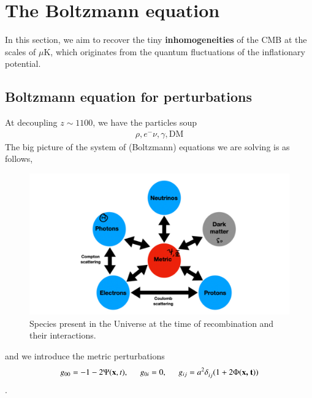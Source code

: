 \documentclass[a4paper, 12pt]{article}
\begin{document}
{{\section{The Boltzmann equation}%
  \label{sec:The Boltzmann equation}
  
In this section, we aim to recover the tiny
\textbf{inhomogeneities} of the CMB at the scales of \( \mu \mathrm{K}
\), which originates from the quantum fluctuations of the inflationary
potential.
\subsection{Boltzmann equation for perturbations}%
  \label{sub:Boltzmann equation for perturbations}
  
  

  At decoupling \( z \sim 1100 \), we have the particles soup 
  \begin{align}
    \label{z 1100 particle soup}
    \rho, e^- \nu, \gamma, \mathrm{DM}
  \end{align}
The big picture of the system of (Boltzmann) equations we are solving is
  as follows, 
  \begin{figure}[h!]
  \begin{center}
    \includegraphics[scale=0.3]{Figures/boltzmannspread.jpeg}
  \end{center}
  \caption{Species present in the Universe at the time of
    recombination and their interactions.}
  \label{fig:}
  \end{figure}

  and we introduce the metric perturbations 
  \begin{align}
    \label{metric perturbations}
    g_{00} = -1 - 2 \Psi(\textbf{x}, t), \hspace{0.5cm} g_{0i} = 0,
    \hspace{0.5cm}g_{ij} = a^{2} \delta_{ij}^{} ( 1 + 2
    \Phi(\textbf{x, t}) )  
  \end{align}. 

}}
\end{document}

